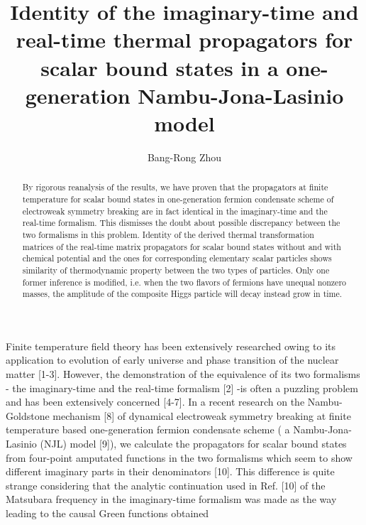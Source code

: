 \documentclass[twocolumn,prd,showpacs,a4paper]{revtex4}
\begin{document}
\title{Identity of the imaginary-time and real-time thermal propagators for scalar bound states in a one-generation Nambu-Jona-Lasinio model 
\\
}
\author{Bang-Rong Zhou}

\begin{abstract}
By rigorous reanalysis of the results, we have proven that the propagators at finite 
temperature for scalar bound states in one-generation fermion condensate scheme of 
electroweak symmetry breaking are in fact identical in the imaginary-time and the 
real-time formalism. This dismisses the doubt about possible discrepancy between the 
two formalisms in this problem. Identity of the derived thermal transformation 
matrices of the real-time matrix propagators for scalar bound states without and with 
chemical potential and the ones for corresponding elementary scalar particles shows 
similarity of thermodynamic property between the two types of particles. Only one 
former inference is modified, i.e. when the two flavors of fermions have unequal 
nonzero masses, the amplitude of the composite Higgs particle will decay instead grow 
in time.  
\end{abstract}
\maketitle
Finite temperature field theory has been extensively researched owing to its 
application to evolution of early universe and phase transition of the nuclear matter 
[1-3]. However, the demonstration of the equivalence of its two formalisms - the 
imaginary-time and the real-time formalism [2] -is often a puzzling problem and has 
been extensively concerned [4-7]. In a recent research on the Nambu-Goldstone 
mechanism [8] of dynamical electroweak symmetry breaking at finite temperature based 
one-generation fermion condensate scheme ( a Nambu-Jona-Lasinio (NJL) model [9]), 
we calculate the propagators for scalar bound states from four-point amputated 
functions in the two formalisms which seem to show different imaginary parts in their 
denominators [10]. This difference is quite strange considering that the analytic 
continuation used in Ref. [10] of the Matsubara frequency in the imaginary-time 
formalism was made as the way leading to the causal Green functions obtained 
\end{document}
